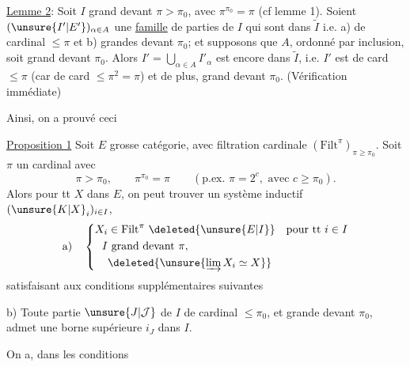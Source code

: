 \uline{Lemme 2}: Soit $I$ grand devant $\pi>\pi_0$, avec $\pi^{\pi_0}=\pi$ (cf lemme 1). Soient $(\unsure{I'|E'})_{\alpha\in A}$ une \uline{famille} de parties de $I$ qui sont dans $\widetilde I$ i.e. a) de cardinal $\leq\pi$ et b) grandes devant $\pi_0$; et supposons que  $A$, ordonné par inclusion, soit grand devant $\pi_0$. Alors $I'=\bigcup_{\alpha\in A}I'_\alpha$ est encore dans $\widetilde I$, i.e. $I'$ est de card $\leq\pi$ (car de card $\leq\pi^2=\pi$) et de plus, grand devant $\pi_0$. (Vérification immédiate)

Ainsi, on a prouvé ceci

\uline{Proposition 1} Soit $E$ grosse catégorie, avec filtration cardinale $(\mathrm{Filt}^{\pi})_{\pi\geq\pi_0}$. Soit $\pi$ un cardinal avec
\margin{$\big|$}
\[
\pi>\pi_0,\qquad\pi^{\pi_0}=\pi\qquad(\text{p.ex. }\pi=2^c,\text{ avec }c\geq\pi_0).
\]
Alors pour tt $X$ dans $E$, on peut trouver un système inductif $(\unsure{K|X}_i)_{i\in I}$,  
\margin{$\big|$}
\[
\text{a)}\quad\left\{\begin{aligned}
X_i&\in\mathrm{Filt}^{\pi}\ \deleted{\unsure{E|I}}\quad\text{pour tt }i\in I\\
I&\text{ grand devant }\pi,\\
&\deleted{\unsure{\varinjlim X_i\simeq X}}
\end{aligned}\right.
\]
satisfaisant aux conditions supplémentaires suivantes

b) Toute partie $\unsure{J|\mathcal J}$ de $I$ de cardinal $\leq\pi_0$, et grande devant $\pi_0$, admet une borne supérieure $i_J$ dans $I$.

 On  a, dans les conditions
